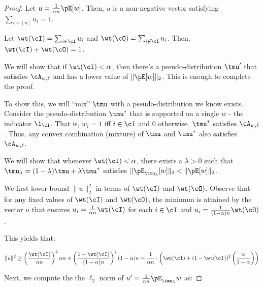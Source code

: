 \begin{proof}
Let $u = \frac{1}{\alpha n}\pE[w]$. Then, $u$ is a non-negative vector satisfying $\sum_{i \sim [n]} u_i = 1$.


Let $\wt(\cI) = \sum_{i \in \cI} u_i$ and $\wt(\cO) = \sum_{i \not \in \cI} u_i$. Then, $\wt(\cI) + \wt(\cO) = 1$.

We will show that if $\wt(\cI) < \alpha$, then there's a pseudo-distribution $\tmu'$ that satisfies $\cA_{w,\ell}$ and has a lower value of $\|\pE[w]\|_2$. This is enough to complete the proof. 

To show this, we will ``mix'' $\tmu$ with a pseudo-distribution we know exists. Consider the pseudo-distribution $\tmu^*$ that is supported on a single $w$ - the indicator $\1_{\cI}$. That is, $w_i = 1$ iff $i \in \cI$ and $0$ otherwise. $\tmu^*$ satisfies $\cA_{w,\ell}$. Thus, any convex combination (mixture) of $\tmu$ and $\tmu^*$ also satisfies $\cA_{w,\ell}$. 

We will show that whenever $\wt(\cI) < \alpha$, there exists a $\lambda > 0 $ such that $\tmu_{\lambda} = (1-\lambda) \tmu + \lambda \tmu^*$ satisfies $\|\pE_{\tmu_{\lambda}}[w]\|_2 < \|\pE[w]\|_2$.  




We first lower bound $\|u\|_2^2$ in terms of $\wt(\cI)$ and $\wt(\cO)$. Observe that for any fixed values of $\wt(\cI)$ and $\wt(\cO)$, the minimum is attained by the vector $u$ that ensures $u_i = \frac{1}{\alpha n} \wt(\cI)$ for each $i \in \cI$ and $u_i = \frac{1}{(1-\alpha)n} \wt(\cO)$. 

This yields that:


\begin{align*}
    \|u\|^2 &\geq \left( \frac{\wt(\cI)}{\alpha n} \right)^2 \alpha n + \left(\frac{1-\wt(\cI)}{(1-\alpha) n}\right)^2 (1-\alpha) n 
    = \frac{1}{\alpha n}\cdot \left( \wt(\cI) + (1-\wt(\cI))^2 \left(\frac{\alpha}{1-\alpha}\right) \right) \\
\end{align*}




Next, we compute the the $\ell_2$ norm of $u' = \frac{1}{\alpha n} \pE_{\tmu_{\lambda}} w$ as:


\end{proof}
